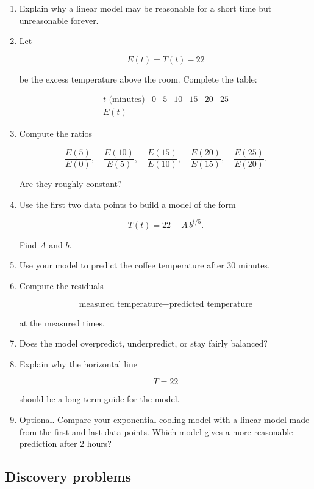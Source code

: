 \begin{enumerate}
\item Explain why a linear model may be reasonable for a short time but unreasonable forever.

\item Let

\[
E(t)=T(t)-22
\]

be the excess temperature above the room. Complete the table:

\[
\begin{array}{c|cccccc}
t\text{ (minutes)} & 0 & 5 & 10 & 15 & 20 & 25 \\ \hline
E(t) & & & & & &
\end{array}
\]

\item Compute the ratios

\[
\frac{E(5)}{E(0)},\quad
\frac{E(10)}{E(5)},\quad
\frac{E(15)}{E(10)},\quad
\frac{E(20)}{E(15)},\quad
\frac{E(25)}{E(20)}.
\]

Are they roughly constant?

\item Use the first two data points to build a model of the form

\[
T(t)=22+A\,b^{t/5}.
\]

Find \(A\) and \(b\).

\item Use your model to predict the coffee temperature after \(30\) minutes.

\item Compute the residuals

\[
\text{measured temperature} - \text{predicted temperature}
\]

at the measured times.

\item Does the model overpredict, underpredict, or stay fairly balanced?

\item Explain why the horizontal line

\[
T=22
\]

should be a long-term guide for the model.

\item Optional. Compare your exponential cooling model with a linear model made from the first and last data points. Which model gives a more reasonable prediction after \(2\) hours?
\end{enumerate}

\subsection{Discovery problems}
\label{subsec:chapter-2-discovery-problems}

